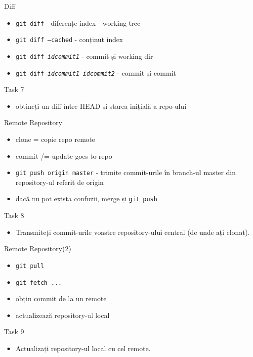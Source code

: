 \documentclass{beamer}
\begin{document}
\begin{frame}{Diff}
  \begin{itemize}
    \item \texttt{git diff} - diferențe index - working tree
    \item \texttt{git diff --cached} - conținut index
    \item \texttt{git diff \textit{idcommit1}} - commit și working dir
    \item \texttt{git diff \textit{idcommit1} \textit{idcommit2}} - commit și
    commit
  \end{itemize}
  \pause
  \begin{alertblock}{Task 7}
    \begin{itemize}
      \item obtineți un diff între HEAD și starea inițială a repo-ului
    \end{itemize}
  \end{alertblock}
\end{frame}

\begin{frame}{Remote Repository}
  \begin{itemize}
    \item clone = copie repo remote
    \item commit /= update goes to repo
    \item \texttt{git push origin master} - trimite commit-urile în branch-ul
    master din repository-ul referit de origin
    \item dacă nu pot exista confuzii, merge și \texttt{git push}
  \end{itemize}
  \pause
  \begin{alertblock}{Task 8}
    \begin{itemize}
      \item Transmiteți commit-urile voastre repository-ului central (de unde
      ați clonat).
    \end{itemize}
  \end{alertblock}
\end{frame}

\begin{frame}{Remote Repository(2)}
  \begin{itemize}
    \item \texttt{git pull}
    \item \texttt{git fetch ...}
    \item obțin commit de la un remote
    \item actualizează repository-ul local
  \end{itemize}
  \pause
  \begin{alertblock}{Task 9}
    \begin{itemize}
      \item Actualizați repository-ul local cu cel remote.
    \end{itemize}
  \end{alertblock}
\end{frame}
\end{document}
